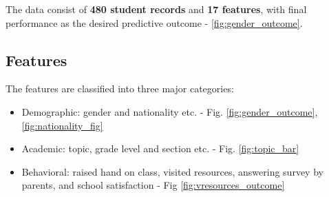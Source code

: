 \documentclass{sigchi}
\begin{document}
The data consist of \textbf{480 student records} and \textbf{17 features}, with final performance as the desired predictive outcome - \ref{fig:gender_outcome}. 

\subsection{Features}
The features are classified into three major categories:

\begin{itemize}
	\item Demographic: gender and nationality etc. - Fig. \ref{fig:gender_outcome}, \ref{fig:nationality_fig}
	\item Academic: topic, grade level and section etc. - Fig. \ref{fig:topic_bar}
	\item Behavioral: raised hand on class, visited resources, answering survey by parents, and school satisfaction - Fig \ref{fig:vresources_outcome}
\end{itemize}
\end{document}
